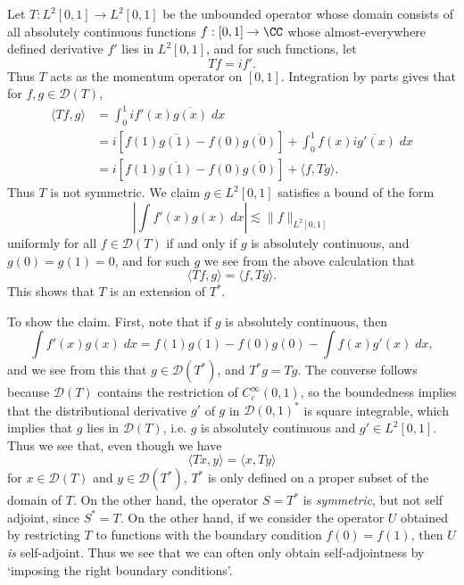 \begin{example}
    Let $T: L^2[0,1] \to L^2[0,1]$ be the unbounded operator whose domain consists of all absolutely continuous functions $f: [0,1] \to \CC$ whose almost-everywhere defined derivative $f'$ lies in $L^2[0,1]$, and for such functions, let
    \[ Tf = if'. \]
    Thus $T$ acts as the momentum operator on $[0,1]$. Integration by parts gives that for $f,g \in \mathcal{D}(T)$,
    \begin{align*}
        \langle Tf, g \rangle &= \int_0^1 if'(x) \overline{g(x)}\; dx\\
        &= i [ f(1) \overline{g(1)} - f(0) \overline{g(0)} ] + \int_0^1 f(x) \overline{i g'(x)}\; dx\\
        &= i [ f(1) \overline{g(1)} - f(0) \overline{g(0)} ] + \langle f, Tg \rangle.
    \end{align*}
    Thus $T$ is not symmetric. We claim $g \in L^2[0,1]$ satisfies a bound of the form
    \[ \left| \int f'(x) g(x)\; dx \right| \lesssim \| f \|_{L^2[0,1]} \]
    uniformly for all $f \in \mathcal{D}(T)$ if and only if $g$ is absolutely continuous, and $g(0) = g(1) = 0$, and for such $g$ we see from the above calculation that
    \[ \langle Tf, g \rangle = \langle f, Tg \rangle. \]
    This shows that $T$ is an extension of $T^*$.

    To show the claim. First, note that if $g$ is absolutely continuous, then
    \[ \int f'(x) g(x)\; dx = f(1) g(1) - f(0) g(0) - \int f(x) g'(x)\; dx, \]
    and we see from this that $g \in \mathcal{D}(T^*)$, and $T^*g = Tg$. The converse follows because $\mathcal{D}(T)$ contains the restriction of $C_c^\infty(0,1)$, so the boundedness implies that the distributional derivative $g'$ of $g$ in $\mathcal{D}(0,1)^*$ is square integrable, which implies that $g$ lies in $\mathcal{D}(T)$, i.e. $g$ is absolutely continuous and $g' \in L^2[0,1]$. Thus we see that, even though we have
    \[ \langle Tx, y \rangle = \langle x, Ty \rangle \]
    for $x \in \mathcal{D}(T)$ and $y \in \mathcal{D}(T^*)$, $T^*$ is only defined on a proper subset of the domain of $T$. On the other hand, the operator $ S = T^*$ is \emph{symmetric}, but not self adjoint, since $S^* = T$. On the other hand, if we consider the operator $U$ obtained by restricting $T$ to functions with the boundary condition $f(0) = f(1)$, then $U$ \emph{is} self-adjoint. Thus we see that we can often only obtain self-adjointness by `imposing the right boundary conditions'.
\end{example}

